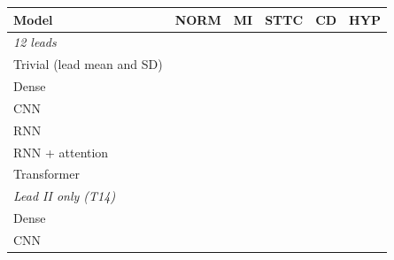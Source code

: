 \begin{tabular}{lccccc}
\toprule
Model & NORM & MI & STTC & CD & HYP \\
\midrule
\multicolumn{6}{l}{\textit{12 leads}} \\
\quad Trivial (lead mean and SD) & \comparisonTestAurocNORMMeanTrivial{} & \comparisonTestAurocMIMeanTrivial{} & \comparisonTestAurocSTTCMeanTrivial{} & \comparisonTestAurocCDMeanTrivial{} & \comparisonTestAurocHYPMeanTrivial{} \\
\quad Dense & \comparisonTestAurocNORMMeanTwelveDense{} & \comparisonTestAurocMIMeanTwelveDense{} & \comparisonTestAurocSTTCMeanTwelveDense{} & \comparisonTestAurocCDMeanTwelveDense{} & \comparisonTestAurocHYPMeanTwelveDense{} \\
\quad CNN & \comparisonTestAurocNORMMeanTwelveCnn{} & \comparisonTestAurocMIMeanTwelveCnn{} & \comparisonTestAurocSTTCMeanTwelveCnn{} & \comparisonTestAurocCDMeanTwelveCnn{} & \comparisonTestAurocHYPMeanTwelveCnn{} \\
\quad RNN & \comparisonTestAurocNORMMeanTwelveRnn{} & \comparisonTestAurocMIMeanTwelveRnn{} & \comparisonTestAurocSTTCMeanTwelveRnn{} & \comparisonTestAurocCDMeanTwelveRnn{} & \comparisonTestAurocHYPMeanTwelveRnn{} \\
\quad RNN + attention & \comparisonTestAurocNORMMeanTwelveRnnattn{} & \comparisonTestAurocMIMeanTwelveRnnattn{} & \comparisonTestAurocSTTCMeanTwelveRnnattn{} & \comparisonTestAurocCDMeanTwelveRnnattn{} & \comparisonTestAurocHYPMeanTwelveRnnattn{} \\
\quad Transformer & \comparisonTestAurocNORMMeanTwelveTransformer{} & \comparisonTestAurocMIMeanTwelveTransformer{} & \comparisonTestAurocSTTCMeanTwelveTransformer{} & \comparisonTestAurocCDMeanTwelveTransformer{} & \comparisonTestAurocHYPMeanTwelveTransformer{} \\
\multicolumn{6}{l}{\textit{Lead II only (T14)}} \\
\quad Dense & \comparisonTestAurocNORMMeanOneleadDense{} & \comparisonTestAurocMIMeanOneleadDense{} & \comparisonTestAurocSTTCMeanOneleadDense{} & \comparisonTestAurocCDMeanOneleadDense{} & \comparisonTestAurocHYPMeanOneleadDense{} \\
\quad CNN & \comparisonTestAurocNORMMeanOneleadCnn{} & \comparisonTestAurocMIMeanOneleadCnn{} & \comparisonTestAurocSTTCMeanOneleadCnn{} & \comparisonTestAurocCDMeanOneleadCnn{} & \comparisonTestAurocHYPMeanOneleadCnn{} \\

\end{tabular}
